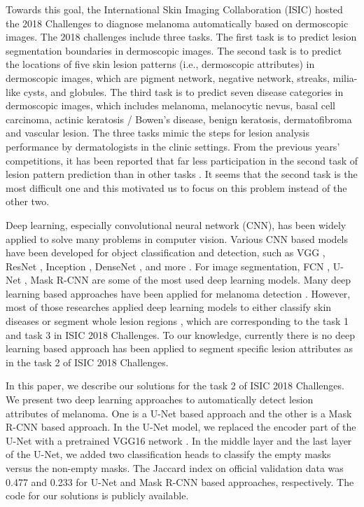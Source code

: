 \documentclass{article}
\begin{document}
Towards this goal, the International Skin Imaging Collaboration (ISIC) hosted the 2018 Challenges to diagnose melanoma automatically based on dermoscopic images. The 2018 challenges include three tasks. The first task is to predict lesion segmentation boundaries in dermoscopic images. The second task is to predict the locations of five skin lesion patterns (i.e., dermoscopic attributes) in dermoscopic images, which are pigment network, negative network, streaks, milia-like cysts, and globules. The third task is to predict seven disease categories in dermoscopic images, which includes melanoma, melanocytic nevus, basal cell carcinoma, actinic keratosis / Bowen’s disease, benign keratosis, dermatofibroma and vascular lesion. The three tasks mimic the steps for lesion analysis performance by dermatologists in the clinic settings.  From the previous years' competitions, it has been reported that far less participation in the second task of lesion pattern prediction than in other tasks \citep{codella2018skin}. It seems that the second task is the most difficult one and this motivated us to focus on this problem instead of the other two. 

Deep learning, especially convolutional neural network (CNN), has been widely applied to solve many problems in computer vision. Various CNN based models have been developed for object classification and detection, such as VGG \citep{simonyan2014very}, ResNet \citep{he2016deep}, Inception \citep{szegedy2017inception}, DenseNet \citep{huang2017densely}, and more \citep{liu2017survey}. For image segmentation, FCN \citep{long2015fully}, U-Net \citep{ronneberger2015u}, Mask R-CNN \citep{he2017mask} are some of the most used deep learning models.  Many deep learning based approaches have been applied for melanoma detection \citep{mishra2016overview}. However, most of those researches applied deep learning models to either classify skin diseases \citep{haenssle2018man, yu2018acral} or segment whole lesion regions \citep{zhang2017melanoma}, which are corresponding to the task 1 and task 3 in ISIC 2018 Challenges. To our knowledge, currently there is no deep learning based approach has been applied to segment specific lesion attributes as in the task 2 of ISIC 2018 Challenges. 

In this paper, we describe our solutions for the task 2 of ISIC 2018 Challenges. We present two deep learning approaches to automatically detect lesion attributes of melanoma. One is a U-Net based approach and the other is a Mask R-CNN based approach. In the U-Net model, we replaced the encoder part of the U-Net with a pretrained VGG16 network \citep{shvets2018automatic}. In the middle layer and the last layer of the U-Net, we added two classification heads to classify the empty masks versus the non-empty masks.  The Jaccard index on official validation data was 0.477 and 0.233 for U-Net and Mask R-CNN based approaches, respectively. The code for our solutions is publicly available. 
\end{document}
